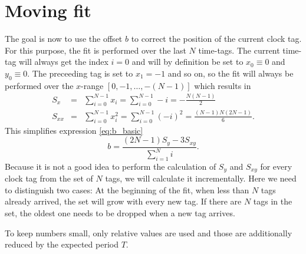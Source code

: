 \documentclass[]{scrreprt}
\begin{document}
\chapter{Moving fit}
The goal is now to use the offset $b$ to correct the position of the current clock tag. For this purpose, the fit is performed over the last $N$ time-tags. The current time-tag will always get the index $i=0$ and will by definition be set to $x_0 \equiv 0$ and $y_0 \equiv 0$. The preceeding tag is set to $x_1 = -1$ and so on, so the fit will always be performed over the $x$-range $[0, -1, \dots , -(N-1)]$ which results in
\begin{eqnarray}
    S_x &=& \sum_{i=0}^{N-1} x_i = \sum_{i=0}^{N-1} -i = - \frac{N (N-1)}{2} \\
    S_{xx} &=& \sum_{i=0}^{N-1} x_i^2 = \sum_{i=0}^{N-1} (-i)^2 = \frac{(N-1) N (2N - 1)}{6}.
\end{eqnarray}
This simplifies expression \ref{eq:b_basic}
\begin{equation}
    b = \frac{(2N - 1) S_y - 3 S_{xy}}{\sum_{i=1}^N i}.
\end{equation}
Because it is not a good idea to perform the calculation of $S_y$ and $S_{xy}$ for every clock tag from the set of $N$ tags, we will calculate it incrementally. Here we need to distinguish two cases: At the beginning of the fit, when less than $N$ tags already arrived, the set will grow with every new tag. If there are $N$ tags in the set, the oldest one needs to be dropped when a new tag arrives.
\par To keep numbers small, only relative values are used and those are additionally reduced by the expected period $T$.
\end{document}
